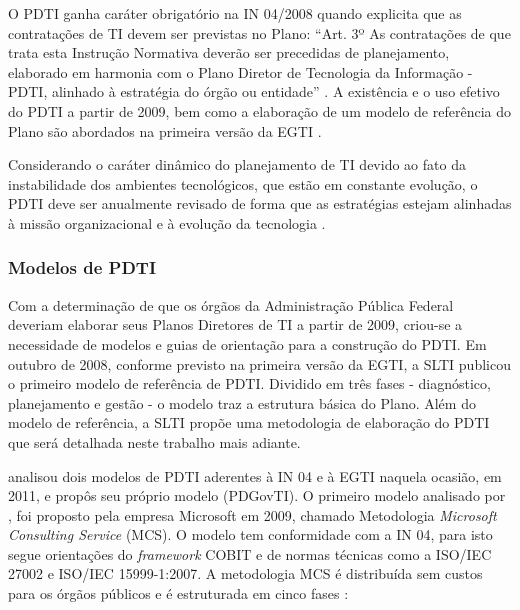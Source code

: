 O PDTI ganha caráter obrigatório na IN 04/2008 quando explicita que as contratações de TI devem ser previstas no Plano: ``Art. 3º As contratações de que trata esta Instrução Normativa deverão ser precedidas de planejamento, elaborado em harmonia com o Plano Diretor de Tecnologia da Informação - PDTI, alinhado à estratégia do órgão ou entidade'' \cite{in04:08}. A existência e o uso efetivo do PDTI a partir de 2009, bem como a elaboração de um modelo de referência do Plano são abordados na primeira versão da EGTI \cite{egti:08}. 


Considerando o caráter dinâmico do planejamento de TI devido ao fato da instabilidade dos ambientes tecnológicos, que estão em constante evolução, o PDTI deve ser anualmente revisado de forma que as estratégias estejam alinhadas à missão organizacional e à evolução da tecnologia \cite{hazan:10}.

\subsubsection{Modelos de PDTI}
Com a determinação de que os órgãos da Administração Pública Federal deveriam elaborar seus Planos Diretores de TI a partir de 2009, criou-se a necessidade de modelos e guias de orientação para a construção do PDTI. Em outubro de 2008, conforme previsto na primeira versão da EGTI, a SLTI publicou o primeiro modelo de referência de PDTI. Dividido em três fases - diagnóstico, planejamento e gestão - o modelo traz a estrutura básica do Plano. Além do modelo de referência, a SLTI propõe uma metodologia de elaboração do PDTI que será detalhada neste trabalho mais adiante.

 analisou dois modelos de PDTI aderentes à IN 04 e à EGTI naquela ocasião, em 2011, e propôs seu próprio modelo (PDGovTI). O primeiro modelo analisado por , foi proposto pela empresa Microsoft em 2009, chamado Metodologia \textit{Microsoft Consulting Service} (MCS). O modelo tem conformidade com a IN 04, para isto segue orientações do \textit{framework} COBIT e de normas técnicas como a ISO/IEC 27002 e ISO/IEC 15999-1:2007. A metodologia MCS é distribuída sem custos para os órgãos públicos e é estruturada em cinco fases \cite{microsoft:09}:

